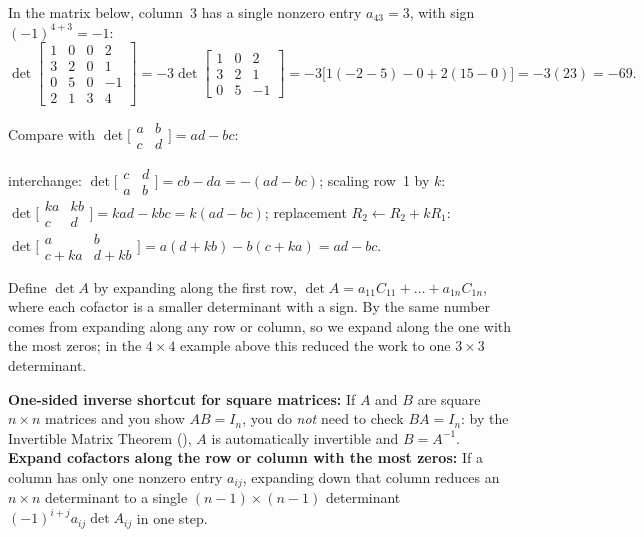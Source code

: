\documentclass[10pt]{scrartcl}
\begin{document}
\begin{example*}
In the matrix below, column~3 has a single nonzero entry $a_{43}=3$, with sign $(-1)^{4+3}=-1$:
\[
  \det\begin{bmatrix}1&0&0&2\\3&2&0&1\\0&5&0&-1\\2&1&3&4\end{bmatrix}
  =-3\det\begin{bmatrix}1&0&2\\3&2&1\\0&5&-1\end{bmatrix}
  =-3\bigl[1(-2-5)-0+2(15-0)\bigr]=-3(23)=-69.
\]
\end{example*}

\begin{example*}
Compare with $\det\bigl[\begin{smallmatrix}a&b\\c&d\end{smallmatrix}\bigr]=ad-bc$:
\begin{itemize}
  \ii interchange: $\det\bigl[\begin{smallmatrix}c&d\\a&b\end{smallmatrix}\bigr]=cb-da=-(ad-bc)$;
  \ii scaling row~1 by $k$: $\det\bigl[\begin{smallmatrix}ka&kb\\c&d\end{smallmatrix}\bigr]=kad-kbc=k(ad-bc)$;
  \ii replacement $R_2\leftarrow R_2+kR_1$: $\det\bigl[\begin{smallmatrix}a&b\\c+ka&d+kb\end{smallmatrix}\bigr]=a(d+kb)-b(c+ka)=ad-bc$.
\end{itemize}
\end{example*}

\revisit
Define $\det A$ by expanding along the first row, $\det A=a_{11}C_{11}+\dots+a_{1n}C_{1n}$, where each cofactor is a smaller determinant with a sign. By  the same number comes from expanding along any row or column, so we expand along the one with the most zeros; in the $4\times4$ example above this reduced the work to one $3\times3$ determinant.

\begin{shortcuts}
  \ii \textbf{One-sided inverse shortcut for square matrices:} If $A$ and $B$ are square $n\times n$ matrices and you show $AB=I_n$, you do \emph{not} need to check $BA=I_n$: by the Invertible Matrix Theorem (), $A$ is automatically invertible and $B=A^{-1}$.
  \ii \textbf{Expand cofactors along the row or column with the most zeros:} If a column has only one nonzero entry $a_{ij}$, expanding down that column reduces an $n\times n$ determinant to a single $(n-1)\times(n-1)$ determinant $(-1)^{i+j}a_{ij}\det A_{ij}$ in one step.
\end{shortcuts}
\end{document}
